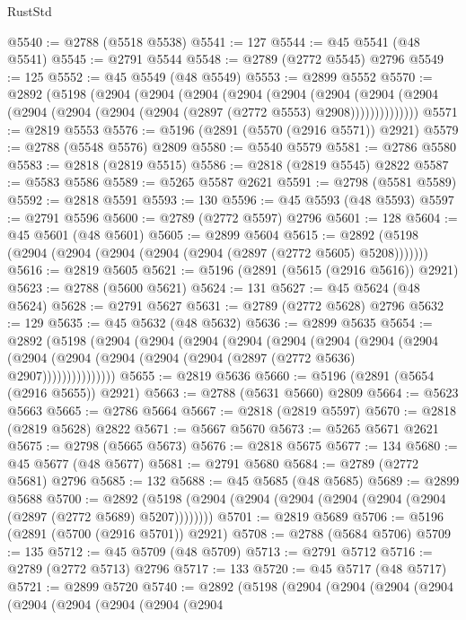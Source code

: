 \begin{lexlean}{RustStd}
\begin{coremodule}
@5540 := @2788 (@5518 @5538)
@5541 := 127
@5544 := @45 @5541 (@48 @5541)
@5545 := @2791 @5544
@5548 := @2789 (@2772 @5545) @2796
@5549 := 125
@5552 := @45 @5549 (@48 @5549)
@5553 := @2899 @5552
@5570 := @2892
    (@5198
      (@2904
        (@2904
          (@2904
            (@2904
              (@2904
                (@2904
                  (@2904 (@2904 (@2904 (@2904 (@2904 (@2904 (@2897 (@2772 @5553) @2908))))))))))))))
@5571 := @2819 @5553
@5576 := @5196 (@2891 (@5570 (@2916 @5571)) @2921)
@5579 := @2788 (@5548 @5576) @2809
@5580 := @5540 @5579
@5581 := @2786 @5580
@5583 := @2818 (@2819 @5515)
@5586 := @2818 (@2819 @5545) @2822
@5587 := @5583 @5586
@5589 := @5265 @5587 @2621
@5591 := @2798 (@5581 @5589)
@5592 := @2818 @5591
@5593 := 130
@5596 := @45 @5593 (@48 @5593)
@5597 := @2791 @5596
@5600 := @2789 (@2772 @5597) @2796
@5601 := 128
@5604 := @45 @5601 (@48 @5601)
@5605 := @2899 @5604
@5615 := @2892 (@5198 (@2904 (@2904 (@2904 (@2904 (@2904 (@2897 (@2772 @5605) @5208)))))))
@5616 := @2819 @5605
@5621 := @5196 (@2891 (@5615 (@2916 @5616)) @2921)
@5623 := @2788 (@5600 @5621)
@5624 := 131
@5627 := @45 @5624 (@48 @5624)
@5628 := @2791 @5627
@5631 := @2789 (@2772 @5628) @2796
@5632 := 129
@5635 := @45 @5632 (@48 @5632)
@5636 := @2899 @5635
@5654 := @2892
    (@5198
      (@2904
        (@2904
          (@2904
            (@2904
              (@2904
                (@2904
                  (@2904
                    (@2904
                      (@2904 (@2904 (@2904 (@2904 (@2904 (@2897 (@2772 @5636) @2907)))))))))))))))
@5655 := @2819 @5636
@5660 := @5196 (@2891 (@5654 (@2916 @5655)) @2921)
@5663 := @2788 (@5631 @5660) @2809
@5664 := @5623 @5663
@5665 := @2786 @5664
@5667 := @2818 (@2819 @5597)
@5670 := @2818 (@2819 @5628) @2822
@5671 := @5667 @5670
@5673 := @5265 @5671 @2621
@5675 := @2798 (@5665 @5673)
@5676 := @2818 @5675
@5677 := 134
@5680 := @45 @5677 (@48 @5677)
@5681 := @2791 @5680
@5684 := @2789 (@2772 @5681) @2796
@5685 := 132
@5688 := @45 @5685 (@48 @5685)
@5689 := @2899 @5688
@5700 := @2892 (@5198 (@2904 (@2904 (@2904 (@2904 (@2904 (@2904 (@2897 (@2772 @5689) @5207))))))))
@5701 := @2819 @5689
@5706 := @5196 (@2891 (@5700 (@2916 @5701)) @2921)
@5708 := @2788 (@5684 @5706)
@5709 := 135
@5712 := @45 @5709 (@48 @5709)
@5713 := @2791 @5712
@5716 := @2789 (@2772 @5713) @2796
@5717 := 133
@5720 := @45 @5717 (@48 @5717)
@5721 := @2899 @5720
@5740 := @2892
    (@5198
      (@2904
        (@2904
          (@2904
            (@2904
              (@2904
                (@2904
                  (@2904
                    (@2904
                      (@2904

\end{coremodule}
\end{lexlean}
